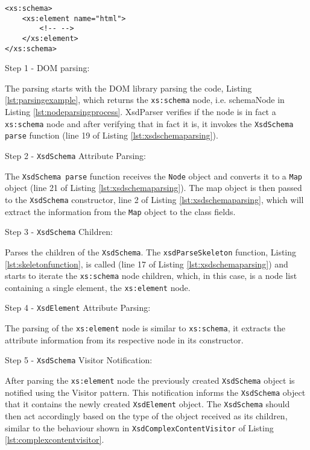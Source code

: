 \begin{minipage}{\linewidth}
\begin{lstlisting}[caption={Parsing Concrete Example},captionpos=b,label={lst:parsingexample}]
<xs:schema>
    <xs:element name="html">
        <!-- -->
    </xs:element>
</xs:schema>
\end{lstlisting}
\end{minipage}


Step 1 - DOM parsing:

\noindent
The parsing starts with the \ac{DOM} library parsing the code, Listing \ref{lst:parsingexample}, which returns the \texttt{xs:schema} node, i.e. schemaNode in Listing \ref{lst:nodeparsingprocess}. XsdParser verifies if the node is in fact a \texttt{xs:schema} node and after verifying that in fact it is, it invokes the \texttt{XsdSchema parse} function (line 19 of Listing \ref{lst:xsdschemaparsing}). 

Step 2 - \texttt{XsdSchema} Attribute Parsing:

\noindent
The \texttt{XsdSchema parse} function receives the \texttt{Node} object and converts it to a \texttt{Map} object (line 21 of Listing \ref{lst:xsdschemaparsing}). The map object is then passed to the \texttt{XsdSchema} constructor, line 2 of Listing \ref{lst:xsdschemaparsing}, which will extract the information from the \texttt{Map} object to the class fields.

Step 3 - \texttt{XsdSchema} Children:

\noindent
Parses the children of the \texttt{XsdSchema}. The \texttt{xsdParseSkeleton} function, Listing \ref{lst:skeletonfunction}, is called (line 17 of Listing \ref{lst:xsdschemaparsing}) and starts to iterate the \texttt{xs:schema} node children, which, in this case, is a node list containing a single element, the \texttt{xs:element} node. 

Step 4 - \texttt{XsdElement} Attribute Parsing:

\noindent
The parsing of the \texttt{xs:element} node is similar to \texttt{xs:schema}, it extracts the attribute information from its respective node in its constructor. 

Step 5 - \texttt{XsdSchema} Visitor Notification:

\noindent
After parsing the \texttt{xs:element} node the previously created \texttt{XsdSchema} object is notified using the Visitor pattern. This notification informs the \texttt{XsdSchema} object that it contains the newly created \texttt{XsdElement} object. The \texttt{XsdSchema} should then act accordingly based on the type of the object received as its children, similar to the behaviour shown in \texttt{XsdComplexContentVisitor} of Listing \ref{lst:complexcontentvisitor}.

